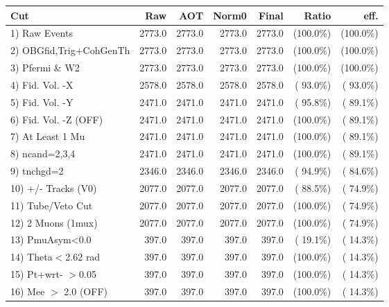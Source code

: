  \begin{table}[h!]\centering
 \begin{tabular}{||l||r|r|r|r|r|r||}
 \hline
 \hline
 Cut & Raw & AOT & Norm0 & Final & Ratio & eff.       \\
 \hline
  1) Raw Events           &       2773.0 &       2773.0 &       2773.0 &       2773.0 & (100.0\%) & (100.0\%) \\
  2) OBGfid,Trig+CohGenTh &       2773.0 &       2773.0 &       2773.0 &       2773.0 & (100.0\%) & (100.0\%) \\
  3) Pfermi \& W2         &       2773.0 &       2773.0 &       2773.0 &       2773.0 & (100.0\%) & (100.0\%) \\
  4) Fid. Vol. -X         &       2578.0 &       2578.0 &       2578.0 &       2578.0 & ( 93.0\%) & ( 93.0\%) \\
  5) Fid. Vol. -Y         &       2471.0 &       2471.0 &       2471.0 &       2471.0 & ( 95.8\%) & ( 89.1\%) \\
  6) Fid. Vol. -Z (OFF)   &       2471.0 &       2471.0 &       2471.0 &       2471.0 & (100.0\%) & ( 89.1\%) \\
  7) At Least 1 Mu        &       2471.0 &       2471.0 &       2471.0 &       2471.0 & (100.0\%) & ( 89.1\%) \\
  8) ncand=2,3,4          &       2471.0 &       2471.0 &       2471.0 &       2471.0 & (100.0\%) & ( 89.1\%) \\
  9) tnchgd=2             &       2346.0 &       2346.0 &       2346.0 &       2346.0 & ( 94.9\%) & ( 84.6\%) \\
 10) +/- Tracks (V0)      &       2077.0 &       2077.0 &       2077.0 &       2077.0 & ( 88.5\%) & ( 74.9\%) \\
 11) Tube/Veto Cut        &       2077.0 &       2077.0 &       2077.0 &       2077.0 & (100.0\%) & ( 74.9\%) \\
 12) 2 Muons (1mux)       &       2077.0 &       2077.0 &       2077.0 &       2077.0 & (100.0\%) & ( 74.9\%) \\
 13) PmuAsym<0.0          &        397.0 &        397.0 &        397.0 &        397.0 & ( 19.1\%) & ( 14.3\%) \\
 14) Theta$<$2.62 rad     &        397.0 &        397.0 &        397.0 &        397.0 & (100.0\%) & ( 14.3\%) \\
 15) Pt+wrt- $>$0.05      &        397.0 &        397.0 &        397.0 &        397.0 & (100.0\%) & ( 14.3\%) \\
 16) Mee $>$ 2.0  (OFF)   &        397.0 &        397.0 &        397.0 &        397.0 & (100.0\%) & ( 14.3\%) \\

\end{tabular}
\end{table}
